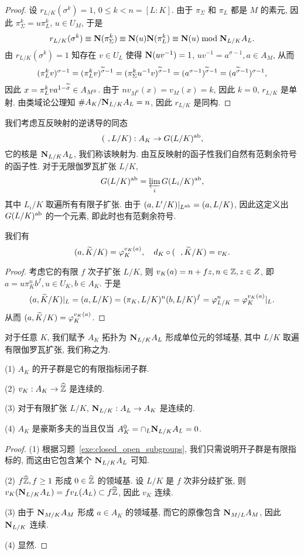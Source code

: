 \begin{proof}
设 $r_{L/K}(\sigma^k)=1$, $0\le k<n=[L:K]$. 由于 $\pi_\Sigma$ 和 $\pi_L$ 都是 $M$ 的素元, 因此 $\pi_\Sigma^k=u\pi_L^k$, $u\in U_M$, 于是
  \[r_{L/K}(\sigma^k)\equiv {\mathbf{N}}(\pi_\Sigma^k)\equiv {\mathbf{N}}(u){\mathbf{N}}(\pi_L^k)\equiv {\mathbf{N}}(u)\bmod {\mathbf{N}}_{L/K}A_L.\]
由 $r_{L/K}(\sigma^k)=1$ 知存在 $v\in U_L$ 使得 ${\mathbf{N}}(uv^{-1})=1$, $uv^{-1}=a^{\sigma-1},a\in A_M$, 从而
  \[(\pi_L^k v)^{\sigma-1}=(\pi_L^k v)^{\widetilde \sigma-1}=(\pi_\Sigma^k u^{-1}v)^{\widetilde \sigma-1}=(a^{\sigma-1})^{\widetilde \sigma-1}=(a^{\widetilde \sigma-1})^{\sigma-1},\] 
因此 $x=\pi_L^k v a^{1-\widetilde \sigma}\in A_{M^0}$. 由于 $nv_{M^0}(x)=v_M(x)=k$, 因此 $k=0$, $r_{L/K}$ 是单射. 由类域论公理知 $\#A_K/{\mathbf{N}}_{L/K}A_L=n$, 因此 $r_{L/K}$ 是同构.
\end{proof}

我们考虑互反映射的逆诱导的同态
  \[(~,L/K):A_K\to G(L/K)^{\mathrm{ab}},\]
它的核是 ${\mathbf{N}}_{L/K}A_L$, 我们称该映射为. 由互反映射的函子性我们自然有范剩余符号的函子性. 对于无限伽罗瓦扩张 $L/K$, 
  \[G(L/K)^{\mathrm{ab}}=\varprojlim\limits_i G(L_i/K)^{\mathrm{ab}},\]
其中 $L_i/K$ 取遍所有有限子扩张. 由于 $(a,L'/K)|_{L^{\mathrm{ab}}}=(a,L/K)$, 因此这定义出 $G(L/K)^{\mathrm{ab}}$ 的一个元素, 即此时也有范剩余符号.

\begin{proposition}{}{}
我们有
  \[(a,\widetilde K/K)=\varphi_K^{v_K(a)},\quad d_K\circ (~~,\widetilde K/K)=v_K.\]
\end{proposition}
\begin{proof}
考虑它的有限 $f$ 次子扩张 $L/K$, 则 $v_K(a)=n+fz,n\in{\mathbb{Z}},z\in Z$, 即 $a=u\pi_K^nb^f,u\in U_K,b\in A_K$. 于是
  \[(a,\widetilde K/K)|_L=(a,L/K)=(\pi_K,L/K)^n(b,L/K)^f=\varphi_{L/K}^n=\varphi_K^{v_K(a)}|_L.\]
从而 $(a,\widetilde K/K)=\varphi_K^{v_K(a)}$.
\end{proof}

对于任意 $K$, 我们赋予 $A_K$ 拓扑为 ${\mathbf{N}}_{L/K}A_L$ 形成单位元的邻域基, 其中 $L/K$ 取遍有限伽罗瓦扩张, 我们称之为.

\begin{proposition}{}{}
(1) $A_K$ 的开子群是它的有限指标闭子群.

(2) $v_K:A_K\to\widehat {{\mathbb{Z}}}$ 是连续的.

(3) 对于有限扩张 $L/K$, ${\mathbf{N}}_{L/K}:A_L\to A_K$ 是连续的.

(4) $A_K$ 是豪斯多夫的当且仅当 $A_K^0=\cap_L {\mathbf{N}}_{L/K}A_L=0$.
\end{proposition}
\begin{proof}
(1) 根据习题~\ref{exe:closed_open_subgroups}, 我们只需说明开子群是有限指标的, 而这由它包含某个 ${\mathbf{N}}_{L/K}A_L$ 可知.

(2) $f\widehat {{\mathbb{Z}}},f\ge 1$ 形成 $0\in\widehat {{\mathbb{Z}}}$ 的领域基. 设 $L/K$ 是 $f$ 次非分歧扩张, 则 $v_K({\mathbf{N}}_{L/K}A_L)=f v_L(A_L)\subset f\widehat {{\mathbb{Z}}}$, 因此 $v_K$ 连续.

(3) 由于 ${\mathbf{N}}_{M/K}A_M$ 形成 $a\in A_K$ 的领域基, 而它的原像包含 ${\mathbf{N}}_{M/L}A_M$, 因此 ${\mathbf{N}}_{L/K}$ 连续.

(4) 显然.
\end{proof}

